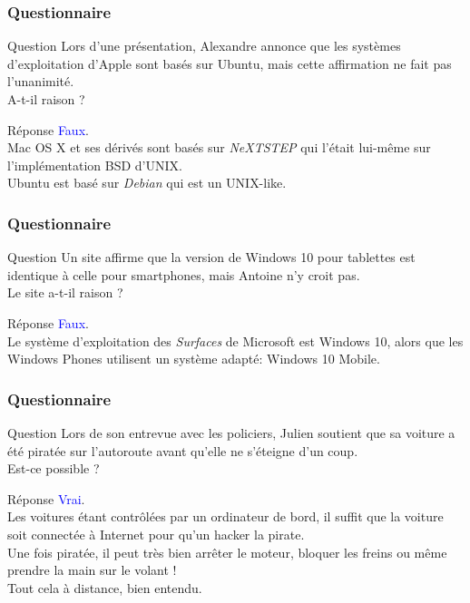 \documentclass[aspectratio=169]{beamer}
\begin{document}
\begin{frame}
  \frametitle{Questionnaire}
  \begin{exampleblock}{Question}
    Lors d’une présentation, Alexandre annonce que les systèmes d’exploitation
    d’Apple sont basés sur Ubuntu, mais cette affirmation ne fait pas
    l’unanimité. \\
    A-t-il raison ?
  \end{exampleblock}

  \pause

  \begin{block}{Réponse}
    \textcolor{blue}{Faux}. \\
    Mac OS X et ses dérivés sont basés sur \textit{NeXTSTEP} qui l'était lui-même
    sur l’implémentation BSD d’UNIX. \\
    Ubuntu est basé sur \textit{Debian} qui est un UNIX-like.
  \end{block}
\end{frame}

\begin{frame}
  \frametitle{Questionnaire}
  \begin{exampleblock}{Question}
    Un site affirme que la version de Windows 10 pour tablettes est identique à
    celle pour smartphones, mais Antoine n’y croit pas. \\
    Le site a-t-il raison ?
  \end{exampleblock}

  \pause

  \begin{block}{Réponse}
    \textcolor{blue}{Faux}. \\
    Le système d'exploitation des \textit{Surfaces} de Microsoft est Windows 10,
    alors que les Windows Phones utilisent un système adapté: Windows 10 Mobile.
  \end{block}
\end{frame}

\begin{frame}
  \frametitle{Questionnaire}
  \begin{exampleblock}{Question}
    Lors de son entrevue avec les policiers, Julien soutient que sa voiture a
    été piratée sur l’autoroute avant qu’elle ne s’éteigne d’un coup. \\
    Est-ce possible ?
  \end{exampleblock}

  \pause

  \begin{block}{Réponse}
    \textcolor{blue}{Vrai}. \\
    Les voitures étant contrôlées par un ordinateur de bord, il suffit que la
    voiture soit connectée à Internet pour qu'un hacker la pirate. \\
    Une fois piratée, il peut très bien arrêter le moteur, bloquer les freins ou
    même prendre la main sur le volant ! \\
    Tout cela à distance, bien entendu.
  \end{block}
\end{frame}
\end{document}
